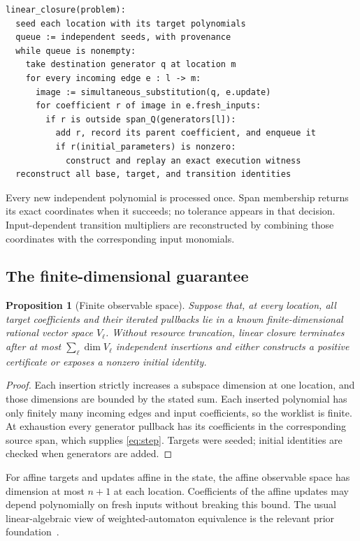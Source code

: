 \documentclass[11pt,letterpaper]{article}
\newtheorem{proposition}[theorem]{Proposition}
\theoremstyle{definition}
\begin{document}
\begin{lstlisting}
linear_closure(problem):
  seed each location with its target polynomials
  queue := independent seeds, with provenance
  while queue is nonempty:
    take destination generator q at location m
    for every incoming edge e : l -> m:
      image := simultaneous_substitution(q, e.update)
      for coefficient r of image in e.fresh_inputs:
        if r is outside span_Q(generators[l]):
          add r, record its parent coefficient, and enqueue it
          if r(initial_parameters) is nonzero:
            construct and replay an exact execution witness
  reconstruct all base, target, and transition identities
\end{lstlisting}

Every new independent polynomial is processed once. Span membership returns its
exact coordinates when it succeeds; no tolerance appears in that decision.
Input-dependent transition multipliers are reconstructed by combining those
coordinates with the corresponding input monomials.

\subsection{The finite-dimensional guarantee}
\begin{proposition}[Finite observable space]\label{prop:linear}
Suppose that, at every location, all target coefficients and their iterated
pullbacks lie in a known finite-dimensional rational vector space $V_\ell$.
Without resource truncation, linear closure terminates after at most
$\sum_\ell\dim V_\ell$ independent insertions and either constructs a positive
certificate or exposes a nonzero initial identity.
\end{proposition}
\begin{proof}
Each insertion strictly increases a subspace dimension at one location, and
those dimensions are bounded by the stated sum. Each inserted polynomial has
only finitely many incoming edges and input coefficients, so the worklist is
finite. At exhaustion every generator pullback has its coefficients in the
corresponding source span, which supplies \eqref{eq:step}. Targets were seeded;
initial identities are checked when generators are added.
\end{proof}

For affine targets and updates affine in the state, the affine observable space
has dimension at most $n+1$ at each location. Coefficients of the affine updates
may depend polynomially on fresh inputs without breaking this bound. The
usual linear-algebraic view of weighted-automaton equivalence is the relevant
prior foundation~\cite{kiefer}.
\end{document}
